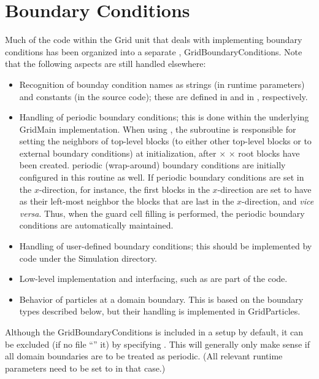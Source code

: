 \section{Boundary Conditions}
\label{Sec:BndryCond}

 Much of the \flashx code within the \unit{Grid} unit that deals with
implementing boundary conditions has been organized into a separate
\subunit, \unit{GridBoundaryConditions}.
Note that the following aspects are still handled elsewhere:
\begin{itemize}
\item Recognition of bounday condition  names as strings (in runtime parameters) 
and constants (in the source code); these are defined in 
 and in ,
respectively.
\item Handling of periodic boundary conditions; this is done within the underlying
\unit{GridMain} implementation. When using \Paramesh,
the subroutine  is responsible for setting the
neighbors of top-level blocks (to either other top-level
blocks or to external boundary conditions) at initialization,
after  $\times$  $\times$ 
root blocks have been created.
periodic (wrap-around) boundary conditions are initially configured in
this routine as well. If periodic boundary conditions are set in the
$x$-direction, for instance, the first blocks in the $x$-direction are
set to have as their left-most neighbor the blocks that are last in
the $x$-direction, and {\it vice versa}. Thus, when the guard cell
filling is performed, the periodic boundary conditions are
automatically maintained.
\item Handling of user-defined boundary conditions; this should be implemented
by code under the 
\newline
\unit{Simulation} directory.
\item
Low-level implementation and interfacing, such as are part of the \Paramesh code.
\item
Behavior of particles at a domain boundary. This is based on the boundary types
described below, but their handling is implemented
in \unit{GridParticles}.
\end{itemize}


Although the \unit{GridBoundaryConditions} \subunit is included in a
setup by default, it can be excluded (if no  file
``'' it) by specifying
. This will generally
only make sense if all domain boundaries are to be treated as
periodic.  (All relevant runtime parameters
 \etc need to be set to  in that
case.)

